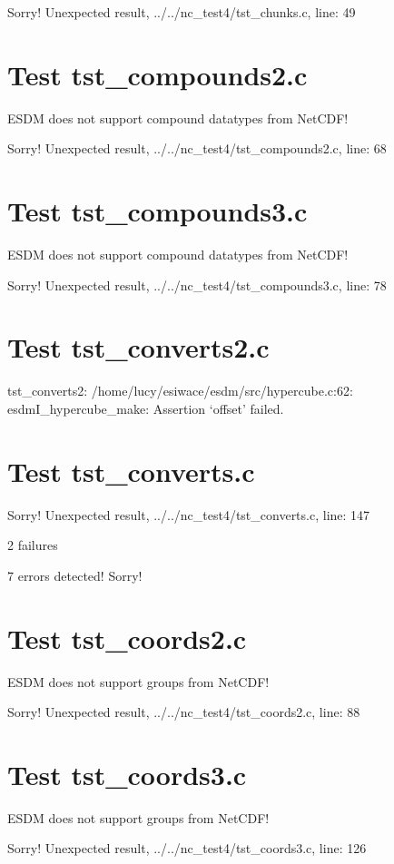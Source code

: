Sorry! Unexpected result, ../../nc\_test4/tst\_chunks.c, line: 49

\section{Test tst\_compounds2.c}

ESDM does not support compound datatypes from NetCDF!

Sorry! Unexpected result, ../../nc\_test4/tst\_compounds2.c, line: 68

\section{Test tst\_compounds3.c}

ESDM does not support compound datatypes from NetCDF!

Sorry! Unexpected result, ../../nc\_test4/tst\_compounds3.c, line: 78

\section{Test tst\_converts2.c}

tst\_converts2: /home/lucy/esiwace/esdm/src/hypercube.c:62: esdmI\_hypercube\_make: Assertion `offset' failed.

\section{Test tst\_converts.c}

Sorry! Unexpected result, ../../nc\_test4/tst\_converts.c, line: 147

2 failures

7 errors detected! Sorry!

\section{Test tst\_coords2.c}

ESDM does not support groups from NetCDF!

Sorry! Unexpected result, ../../nc\_test4/tst\_coords2.c, line: 88

\section{Test tst\_coords3.c}

ESDM does not support groups from NetCDF!

Sorry! Unexpected result, ../../nc\_test4/tst\_coords3.c, line: 126


